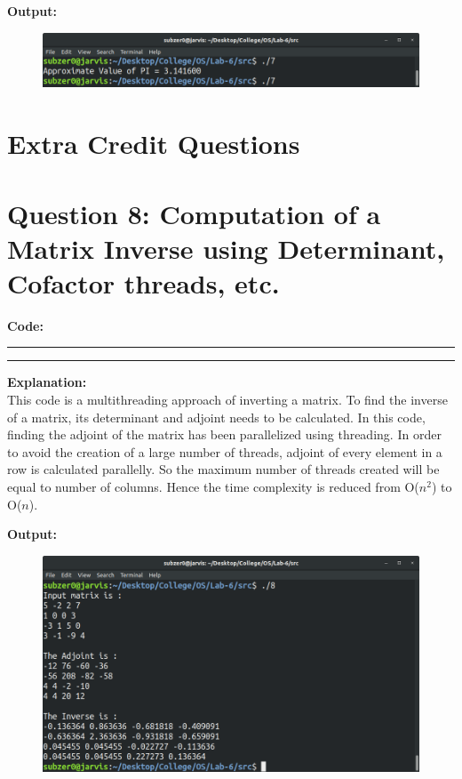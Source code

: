 \documentclass{article}
\begin{document}
\bigskip
\noindent
\textbf{\Large Output:}

\begin{figure}[h]
	\includegraphics[width=\textwidth]{output/7.png}
\end{figure}
\bigskip

\section*{Extra Credit Questions}
\section*{Question 8: Computation of a Matrix Inverse using Determinant, Cofactor threads, etc.}
\bigskip

\par\noindent
\textbf{\Large Code: }
\smallskip
\par\noindent\rule{\textwidth}{0.4pt}

\par\noindent\rule{\textwidth}{0.4pt}

\bigskip
\noindent
\textbf{\Large Explanation: } \\

This code is a multithreading approach of inverting a matrix. 
To find the inverse of a matrix, its determinant and adjoint 
needs to be calculated. In this code, finding the adjoint of the
matrix has been parallelized using threading. In order to avoid
the creation of a large number of threads, adjoint of every 
element in a row is calculated parallelly. So the maximum number
of threads created will be equal to number of columns. Hence the
time complexity is reduced from O($n^2$) to O($n$).


\bigskip
\noindent
\textbf{\Large Output:}

\begin{figure}[h]
	\includegraphics[width=\textwidth]{output/8.png}
\end{figure}
\bigskip
\end{document}
